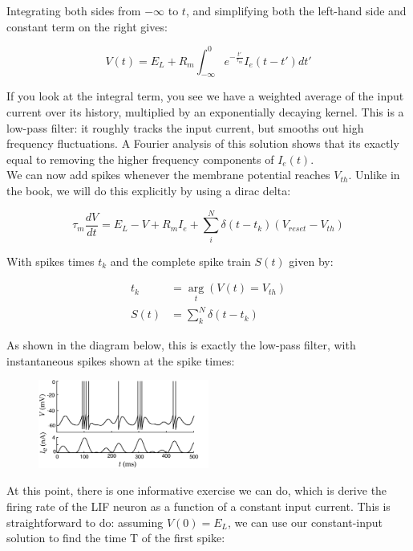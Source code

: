 \documentclass{article}
\begin{document}
Integrating both sides from $-\infty$ to $t$, and simplifying both the left-hand side and constant term on the right gives:

\begin{equation*}
    V(t) =  E_L + R_m\int_{-\infty}^{0}e^{-\frac{t'}{\tau_m}}I_{e}(t-t')dt'
\end{equation*}

If you look at the integral term, you see we have a weighted average of the input current over its history, multiplied by an exponentially decaying kernel. This is a low-pass filter: it roughly tracks the input current, but smooths out high frequency fluctuations. A Fourier analysis of this solution shows that its exactly equal to removing the higher frequency components of $I_{e}(t)$.\\

We can now add spikes whenever the membrane potential reaches $V_{th}$. Unlike in the book, we will do this explicitly by using a dirac delta:

\begin{equation*}
    \tau_m\frac{dV}{dt} = E_L - V + R_mI_{e} + \sum_i^N\delta(t-t_k)(V_{reset}-V_{th})
\end{equation*}

With spikes times $t_k$ and the complete spike train $S(t)$ given by:

\begin{align*}
    t_k &= \underset{t}\arg(V(t) = V_{th})\\
    S(t) &= \sum_k^N\delta(t-t_k)
\end{align*}

As shown in the diagram below, this is exactly the low-pass filter, with instantaneous spikes shown at the spike times:

\begin{figure}[H]
    \centering
    \includegraphics[width=0.5\textwidth]{LIF.png}
\end{figure}

At this point, there is one informative exercise we can do, which is derive the firing rate of the LIF neuron as a function of a constant input current. This is straightforward to do: assuming $V(0) = E_L$, we can use our constant-input solution to find the time T of the first spike:
\end{document}
